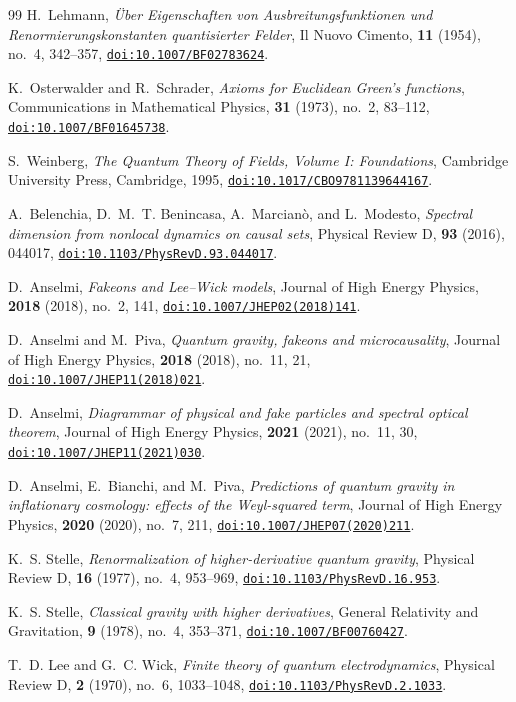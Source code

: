 \documentclass[11pt,a4paper,reqno]{amsart}
\theoremstyle{definition}
\numberwithin{equation}{section}
\providecommand{\doi}[1]{\href{https://doi.org/#1}{\nolinkurl{doi:#1}}}
\providecommand{\doi}[1]{\href{https://doi.org/#1}{\nolinkurl{doi:#1}}}
\begin{document}
\begin{thebibliography}{99}
H.~Lehmann,
\emph{{\"U}ber Eigenschaften von Ausbreitungsfunktionen und Renormierungskonstanten quantisierter Felder},
Il Nuovo Cimento, \textbf{11} (1954), no.~4, 342--357,
\doi{10.1007/BF02783624}.

K.~Osterwalder and R.~Schrader,
\emph{Axioms for Euclidean Green's functions},
Communications in Mathematical Physics, \textbf{31} (1973), no.~2, 83--112,
\doi{10.1007/BF01645738}.

S.~Weinberg,
\emph{The Quantum Theory of Fields, Volume I: Foundations},
Cambridge University Press, Cambridge, 1995,
\doi{10.1017/CBO9781139644167}.

A.~Belenchia, D.~M.~T. Benincasa, A.~Marcian\`o, and L.~Modesto,
\emph{Spectral dimension from nonlocal dynamics on causal sets},
Physical Review D, \textbf{93} (2016), 044017,
\doi{10.1103/PhysRevD.93.044017}.

D.~Anselmi,
\emph{Fakeons and Lee--Wick models},
Journal of High Energy Physics, \textbf{2018} (2018), no.~2, 141,
\doi{10.1007/JHEP02(2018)141}.

D.~Anselmi and M.~Piva,
\emph{Quantum gravity, fakeons and microcausality},
Journal of High Energy Physics, \textbf{2018} (2018), no.~11, 21,
\doi{10.1007/JHEP11(2018)021}.

D.~Anselmi,
\emph{Diagrammar of physical and fake particles and spectral optical theorem},
Journal of High Energy Physics, \textbf{2021} (2021), no.~11, 30,
\doi{10.1007/JHEP11(2021)030}.

D.~Anselmi, E.~Bianchi, and M.~Piva,
\emph{Predictions of quantum gravity in inflationary cosmology: effects of the Weyl-squared term},
Journal of High Energy Physics, \textbf{2020} (2020), no.~7, 211,
\doi{10.1007/JHEP07(2020)211}.

K.~S. Stelle,
\emph{Renormalization of higher-derivative quantum gravity},
Physical Review D, \textbf{16} (1977), no.~4, 953--969,
\doi{10.1103/PhysRevD.16.953}.

K.~S. Stelle,
\emph{Classical gravity with higher derivatives},
General Relativity and Gravitation, \textbf{9} (1978), no.~4, 353--371,
\doi{10.1007/BF00760427}.

T.~D. Lee and G.~C. Wick,
\emph{Finite theory of quantum electrodynamics},
Physical Review D, \textbf{2} (1970), no.~6, 1033--1048,
\doi{10.1103/PhysRevD.2.1033}.


\end{thebibliography}
\end{document}
